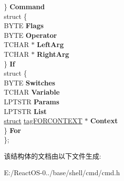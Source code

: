 \begin{DoxyCompactItemize}
\begin{tabbing}
\>\} {\bfseries Command}\\
\>struct \{\\
\>\>BYTE {\bfseries Flags}\\
\>\>BYTE {\bfseries Operator}\\
\>\>TCHAR $\ast$ {\bfseries LeftArg}\\
\>\>TCHAR $\ast$ {\bfseries RightArg}\\
\>\} {\bfseries If}\\
\>struct \{\\
\>\>BYTE {\bfseries Switches}\\
\>\>TCHAR {\bfseries Variable}\\
\>\>LPTSTR {\bfseries Params}\\
\>\>LPTSTR {\bfseries List}\\
\>\>\hyperlink{interfacestruct}{struct} \hyperlink{structtag_f_o_r_c_o_n_t_e_x_t}{tagFORCONTEXT} $\ast$ {\bfseries Context}\\
\>\} {\bfseries For}\\
\}; \\

\end{tabbing}\end{DoxyCompactItemize}


该结构体的文档由以下文件生成\+:\begin{DoxyCompactItemize}
\item 
E\+:/\+React\+O\+S-\/0../base/shell/cmd/cmd.\+h\end{DoxyCompactItemize}
